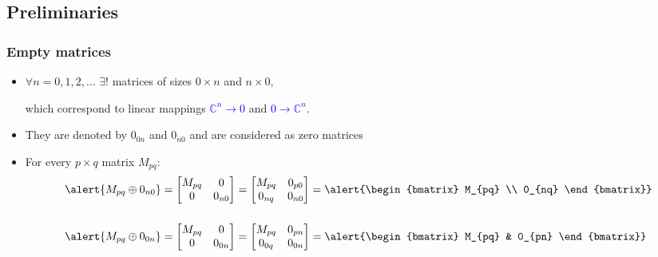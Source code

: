 \documentclass[usenames,dvipsnames]{beamer}
\begin{document}
\subsection{Preliminaries}
\begin{frame}[t]
\frametitle{Empty matrices}

\begin{itemize}
  \item $\forall n=0,1,2,\dots$
      $\exists !$ matrices of sizes
      \alert{$0\times n$} and
      \alert{$n\times 0$},

      which correspond to linear
  mappings
  \textcolor{blue}{$\mathbb C^n\to
  0$} and
  \textcolor{blue}{$0\to\mathbb
      C^n$}.
\medskip

  \item They are denoted by
      \alert{$0_{0n}$} and
      \alert{$0_{n0}$} and are
      considered as zero matrices
\medskip

  \item For every $p\times q$
      matrix $M_{pq}$:
\begin{align*}
\alert{M_{pq}\oplus 0_{n0}}&=\begin{bmatrix}
  M_{pq} & 0 \\
  0 &0_{n0}
\end{bmatrix}=\begin{bmatrix}
  M_{pq}& 0_{p0} \\
  0_{nq}& 0_{n0}
\end{bmatrix}=\alert{\begin{bmatrix}
M_{pq} \\ 0_{nq}
\end{bmatrix}}
\\[5mm]
\alert{M_{pq}\oplus 0_{0n}}&=\begin{bmatrix}
  M_{pq} & 0 \\
  0 & 0_{0n}
\end{bmatrix}=\begin{bmatrix}
  M_{pq}& 0_{pn} \\
  0_{0q}& 0_{0n}
\end{bmatrix}=\alert{\begin{bmatrix}
   M_{pq} & 0_{pn}
\end{bmatrix}}
\end{align*}

\end{itemize}
  \end{frame}
\end{document}
